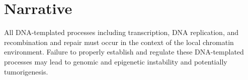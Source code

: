 
\section*{Narrative}
All DNA-templated processes including transcription, DNA replication, and recombination and
repair must occur in the context of the local chromatin environment. Failure to properly
establish and regulate these DNA-templated processes may lead to genomic and epigenetic instability and potentially tumorigenesis. 
